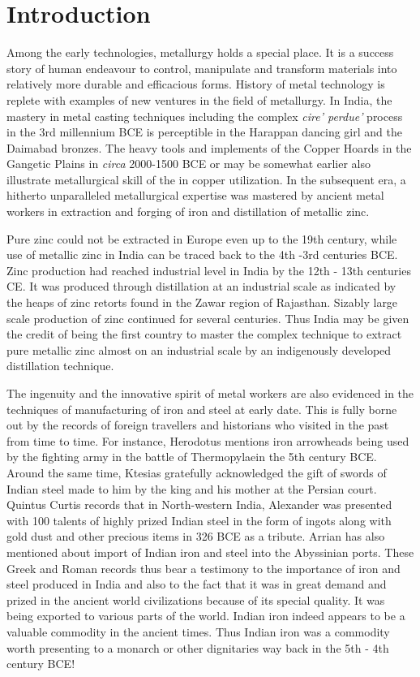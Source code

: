 
\chapter{Introduction}

Among the early technologies, metallurgy holds a special place. It is a success story of human endeavour to control, manipulate and transform materials into relatively more durable and efficacious forms. History of metal technology is replete with examples of new ventures in the field of metallurgy. In India, the mastery in metal casting techniques including the complex \textit{cire' perdue'} process in the 3rd millennium BCE is perceptible in the Harappan dancing girl and the Daimabad bronzes. The heavy tools and implements of the Copper Hoards in the Gangetic Plains in \textit{circa} 2000-1500 BCE or may be somewhat earlier also illustrate metallurgical skill of the in copper utilization. In the subsequent era, a hitherto unparalleled metallurgical expertise was mastered by ancient metal workers in extraction and forging of iron and distillation of metallic zinc.

Pure zinc could not be extracted in Europe even up to the 19th century, while use of metallic zinc in India can be traced back to the 4th -3rd centuries BCE. Zinc production had reached industrial level in India by the 12th - 13th centuries CE. It was produced through distillation at an industrial scale as indicated by the heaps of zinc retorts found in the Zawar region of Rajasthan. Sizably large scale production of zinc continued for several centuries. Thus India may be given the credit of being the first country to master the complex technique to extract pure metallic zinc almost on an industrial scale by an indigenously developed distillation technique.

The ingenuity and the innovative spirit of metal workers are also evidenced in the techniques of manufacturing of iron and steel at early date. This is fully borne out by the records of foreign travellers and historians who visited in the past from time to time. For instance, Herodotus mentions iron arrowheads being used by the fighting army in the battle of Thermopylaein the 5th century BCE. Around the same time, Ktesias gratefully acknowledged the gift of swords of Indian steel made to him by the king and his mother at the Persian court. Quintus Curtis records that in North-western India, Alexander was presented with 100 talents of highly prized Indian steel in the form of ingots along with gold dust and other precious items in 326 BCE as a tribute. Arrian has also mentioned about import of Indian iron and steel into the Abyssinian ports. These Greek and Roman records thus bear a testimony to the importance of iron and steel produced in India and also to the fact that it was in great demand and prized in the ancient world civilizations because of its special quality. It was being exported to various parts of the world. Indian iron indeed appears to be a valuable commodity in the ancient times. Thus Indian iron was a commodity worth presenting to a monarch or other dignitaries way back in the 5th - 4th century BCE!


